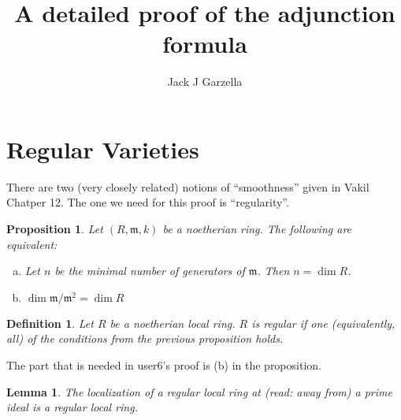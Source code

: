 \documentclass[a4paper]{article}
\title{A detailed proof of the adjunction formula}
\author{Jack J Garzella}
\newtheorem{lem}[thm]{Lemma}
\newtheorem{prop}[thm]{Proposition}
\newtheorem{defn}[thm]{Definition}
\begin{document}
\maketitle

\section{Regular Varieties}

There are two (very closely related)
notions of ``smoothness'' given in Vakil Chatper 12.
The one we need for this proof is ``regularity''.

\begin{prop}
	Let \((R,\mathfrak{m},k)\) be a noetherian ring. 
	The following are equivalent:
	\begin{enumerate}[(a)]
		\item Let \(n\) be the minimal number of generators of
			\(\mathfrak{m}\).
			Then \(n = \dim R\).
		\item \(\dim \mathfrak{m} / \mathfrak{m}^{2}  = \dim R\)
	\end{enumerate}
\end{prop}


\begin{defn}
	Let \(R\) be a noetherian local ring.
	\(R\) is \textit{regular} if one (equivalently, all)
	of the conditions from the previous proposition holds.
\end{defn}

The part that is needed in user6's proof is (b) in the proposition.

\begin{lem}
	The localization of a regular local ring at (read: away from) a prime 
	ideal is a regular local ring.
\end{lem}


\end{document}
